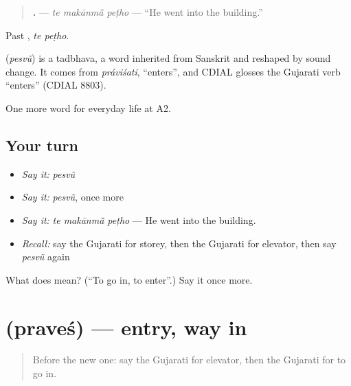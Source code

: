 \begin{quote}
\textbf{  .} — \emph{te makānmā̃ peṭho} — \textquotedblleft{}He went into the building.\textquotedblright{}
\end{quote}

Past \textbf{ }, \emph{te peṭho}.

\begin{cousinweb}
\textbf{} (\emph{pesvũ}) is a tadbhava, a word inherited from Sanskrit and reshaped by sound change. It comes from \emph{práviśati}, \textquotedblleft{}enters\textquotedblright{}, and CDIAL glosses the Gujarati verb \textquotedblleft{}enters\textquotedblright{} (CDIAL 8803).
\end{cousinweb}

\begin{grammarlens}[title={What you've built}]
One more word for everyday life at A2.
\end{grammarlens}

\subsection*{Your turn}
\begin{itemize}
\raggedright
  \item \emph{Say it:} \emph{pesvũ}
  \item \emph{Say it:} \emph{pesvũ}, once more
  \item \emph{Say it:} \emph{te makānmā̃ peṭho} — He went into the building.
  \item \emph{Recall:} say the Gujarati for storey, then the Gujarati for elevator, then say \emph{pesvũ} again
\end{itemize}

\begin{tcolorbox}[breakable,colback=teal!4,colframe=teal!35!black,title={Before you move on}]
What does  mean? (\textquotedblleft{}To go in, to enter\textquotedblright{}.) Say it once more.
\end{tcolorbox}
\section[\texorpdfstring{\gu{પ્રવેશ} (praveś)}{પ્રવેશ (praveś)}]{ (praveś) — entry, way in}

\label{lesson:GU-C196-praves}



\begin{quote}
Before the new one: say the Gujarati for elevator, then the Gujarati for to go in.
\end{quote}

